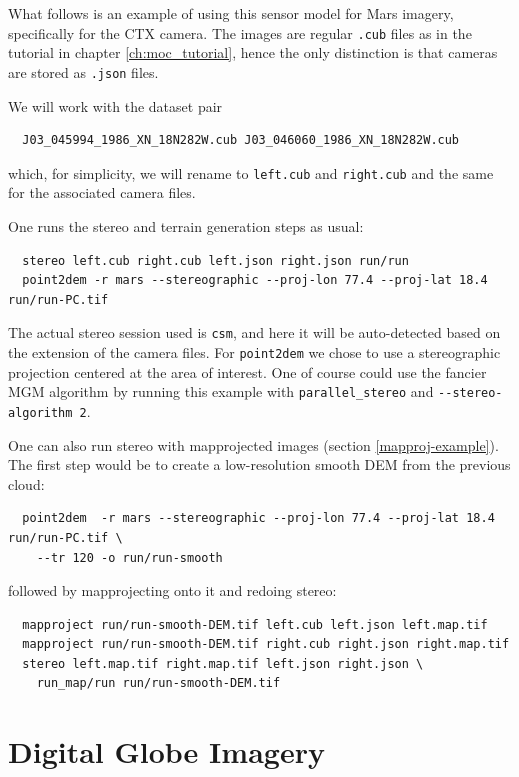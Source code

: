 What follows is an example of using this sensor model for Mars imagery,
specifically for the CTX camera. The images are regular \texttt{.cub}
files as in the tutorial in chapter \ref{ch:moc_tutorial}, hence
the only distinction is that cameras are stored as \texttt{.json} files.

We will work with the dataset pair 

\begin{verbatim}
  J03_045994_1986_XN_18N282W.cub J03_046060_1986_XN_18N282W.cub
\end{verbatim}

which, for simplicity, we will rename to \texttt{left.cub} and \texttt{right.cub}
and the same for the associated camera files.

One runs the stereo and terrain generation steps as usual:

\begin{verbatim}
  stereo left.cub right.cub left.json right.json run/run    
  point2dem -r mars --stereographic --proj-lon 77.4 --proj-lat 18.4 run/run-PC.tif
\end{verbatim}

The actual stereo session used is \texttt{csm}, and here it will be auto-detected
based on the extension of the camera files. For \texttt{point2dem} we chose
to use a stereographic projection centered at the area of interest. One of course
could use the fancier MGM algorithm by running this example with \texttt{parallel\_stereo}
and \texttt{-\/-stereo-algorithm 2}. 

One can also run stereo with mapprojected images (section \ref{mapproj-example}). 
The first step would be to create a low-resolution smooth DEM from the previous cloud:

\begin{verbatim}
  point2dem  -r mars --stereographic --proj-lon 77.4 --proj-lat 18.4 run/run-PC.tif \
    --tr 120 -o run/run-smooth
\end{verbatim}

followed by mapprojecting onto it and redoing stereo:

\begin{verbatim}
  mapproject run/run-smooth-DEM.tif left.cub left.json left.map.tif
  mapproject run/run-smooth-DEM.tif right.cub right.json right.map.tif
  stereo left.map.tif right.map.tif left.json right.json \
    run_map/run run/run-smooth-DEM.tif
\end{verbatim}

\section{Digital Globe Imagery}
\label{digital_globe_data}


